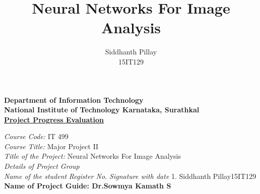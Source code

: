 \documentclass{nitk}
\title{Neural Networks For Image Analysis} %
\author{
    Siddhanth Pillay \\
    15IT129
}
\begin{document}
    \maketitle %
    \newpage
    \thispagestyle{empty}
    \begin{center}
        {\Large \textbf{Department of Information Technology}}\\
        {\large \textbf{National Institute of Technology Karnataka, Surathkal}}\\
      \vspace{20}
        {\large \underline {\textbf{Project Progress Evaluation}}}
    \end{center}
    \vspace{10}
    \begin{flushleft}
    {\large \textit{Course Code:} {IT 499}}
    \vspace{15}
    \\
    {\large \textit{Course Title:} {Major Project II}}
    \vspace{15}
    \\
    {\large \textit{Title of the Project:} {Neural  Networks For Image Analysis}}
    \vspace{15}
    \\
    {\large \textit{Details of Project Group}}
    \vspace{15}
    \\
    {\large \textit{Name of the student}} \hspace{30} {\large \textit{Register No.}} \hspace{50} {\large \textit{Signature with date}}
    \hline
    \vspace{10}
    {1. Siddhanth Pillay\hspace{70}15IT129}\\\vspace{10}
    \vspace{10}
    \vfill
     {\large \textbf{Name of Project Guide: Dr.Sowmya Kamath S}}
    \vspace{15}
    \\
     {\large {}}
    \vspace{15}
    \\
     {\large {}}
    \vspace{15}
    \\
     {\large {}}
    \vspace{15}
    \\
    \end{flushleft}
\end{document}
